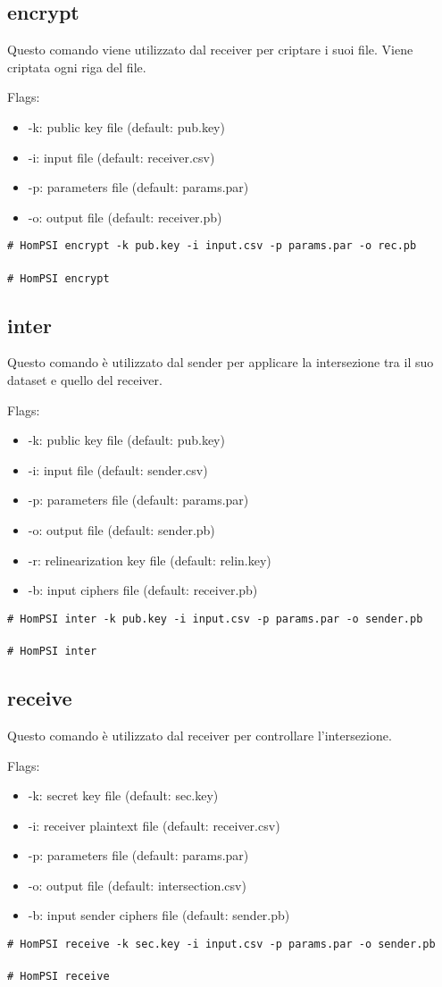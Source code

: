 \documentclass[]{article}
\newcommand{\shellcmd}[1]{\texttt{\footnotesize\# #1}}
\begin{document}
\subsection{encrypt}
Questo comando viene utilizzato dal receiver per criptare i suoi file. Viene criptata ogni riga del file.

Flags: 
\begin{itemize}
	\item -k: public key file (default: pub.key)
	\item -i: input file (default: receiver.csv)
	\item -p: parameters file (default: params.par)
	\item -o: output file (default: receiver.pb)
\end{itemize}
\shellcmd{HomPSI encrypt -k pub.key -i input.csv -p params.par -o rec.pb}\\
\\\shellcmd{HomPSI encrypt}

\subsection{inter}
Questo comando è utilizzato dal sender per applicare la intersezione tra il suo dataset e quello del receiver. 

Flags:
\begin{itemize}
	\item -k: public key file (default: pub.key)
	\item -i: input file (default: sender.csv)
	\item -p: parameters file (default: params.par)
	\item -o: output file (default: sender.pb)
	\item -r: relinearization key file (default: relin.key)
	\item -b: input ciphers file (default: receiver.pb)
\end{itemize}
\shellcmd{HomPSI inter -k pub.key -i input.csv -p params.par -o sender.pb}\\
\\\shellcmd{HomPSI inter}
\subsection{receive}
Questo comando è utilizzato dal receiver per controllare l'intersezione.

Flags:
\begin{itemize}
	\item -k: secret key file (default: sec.key)
	\item -i: receiver plaintext file (default: receiver.csv)
	\item -p: parameters file (default: params.par)
	\item -o: output file (default: intersection.csv)
	\item -b: input sender ciphers file (default: sender.pb)
\end{itemize}
\shellcmd{HomPSI receive -k sec.key -i input.csv -p params.par -o sender.pb}\\
\\\shellcmd{HomPSI receive}
\end{document}
